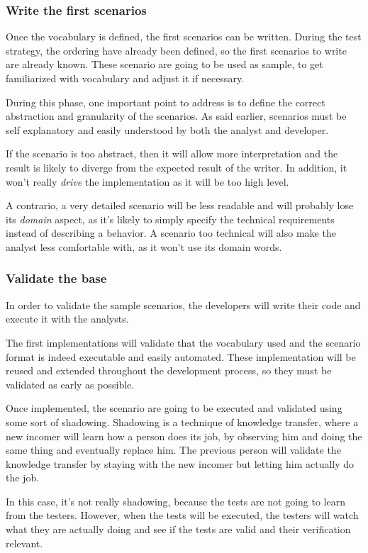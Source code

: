 \subsubsection{Write the first scenarios}
Once the vocabulary is defined, the first scenarios can be written.
During the test strategy, the ordering have already been defined, so the
first scenarios to write are already known.
These scenario are going to be used as sample, to get familiarized
with vocabulary and adjust it if necessary.

During this phase, one important point to address is to define the correct
abstraction and granularity of the scenarios.
As said earlier, scenarios must be self explanatory and easily understood by
both the analyst and developer.

If the scenario is too abstract, then it will allow more interpretation and
the result is likely to diverge from the expected result of the writer.
In addition, it won't really \textit{drive} the implementation as it will be
too high level.

A contrario, a very detailed scenario will be less readable and will probably
lose its \textit{domain} aspect, as it's likely to simply specify the
technical requirements instead of describing a behavior.
A scenario too technical will also make the analyst less comfortable with, as
it won't use its domain words.

\subsubsection{Validate the base}
In order to validate the sample scenarios, the developers will write their
code and execute it with the analysts.

The first implementations will validate that the vocabulary used and the
scenario format is indeed executable and easily automated.
These implementation will be reused and extended throughout the development
process, so they must be validated as early as possible.

Once implemented, the scenario are going to be executed and validated using
some sort of shadowing.
Shadowing is a technique of knowledge transfer, where a new incomer will learn
how a person does its job, by observing him and doing the same thing and
eventually replace him.
The previous person will validate the knowledge transfer by staying with the
new incomer but letting him actually do the job.

In this case, it's not really shadowing, because the tests are not going to
learn from the testers.
However, when the tests will be executed, the testers will watch what they
are actually doing and see if the tests are valid and their verification
relevant.

